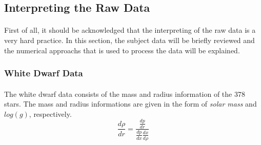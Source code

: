 \documentclass[letterpaper,12pt]{article}
\begin{document}
\subsection{Interpreting the Raw Data}
\paragraph{} First of all, it should be acknowledged that the interpreting of the raw data is a very hard practice. In this section, the subject data will be briefly reviewed and the numerical approachs that is used to process the data will be explained.

\subsubsection{White Dwarf Data}

\paragraph{} The white dwarf data consists of the mass and radius information of the 378 stars. The mass and radius informations are given in the form of \textit{solar mass} and $\mathit{log(g)}$, respectively. 
\begin{equation*}
    \frac{d \rho}{dr} = \frac{\frac{dp}{dr}}{\frac{dp}{dx} \frac{dx}{d \rho}}
\end{equation*}
\end{document}
